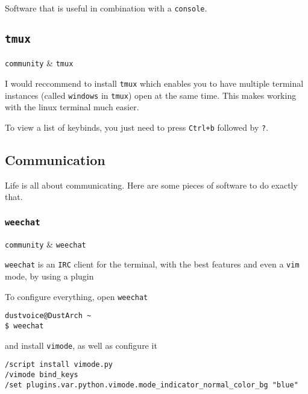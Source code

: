 \documentclass[10pt]{dustdoc}
\begin{document}
Software that is useful in combination with a \texttt{console}.

\subsection{\texttt{tmux}}
\label{sec:tmux}

\begin{packagetable}
    \texttt{community} & \texttt{tmux} \\
\end{packagetable}

I would reccommend to install \texttt{tmux} which enables you to have multiple terminal instances (called \texttt{windows} in \texttt{tmux}) open at the same time.
This makes working with the linux terminal much easier.

\begin{NOTE}
    To view a list of keybinds, you just need to press \texttt{Ctrl+\allowbreak{}b} followed by \texttt{?}.
\end{NOTE}

\subsection{Communication}
\label{sec:console-communication}

Life is all about communicating.
Here are some pieces of software to do exactly that.

\subsubsection{\texttt{weechat}}
\label{sec:weechat}

\begin{packagetable}
    \texttt{community} & \texttt{weechat} \\
\end{packagetable}

\texttt{weechat} is an \texttt{IRC} client for the terminal, with the best features and even a \texttt{vim} mode, by using a plugin

To configure everything, open \texttt{weechat}

\begin{verbatim}
dustvoice@DustArch ~
$ weechat
\end{verbatim}

\noindent
and install \texttt{vimode}, as well as configure it

\begin{verbatim}
/script install vimode.py
/vimode bind_keys
/set plugins.var.python.vimode.mode_indicator_normal_color_bg "blue"
\end{verbatim}
\end{document}
